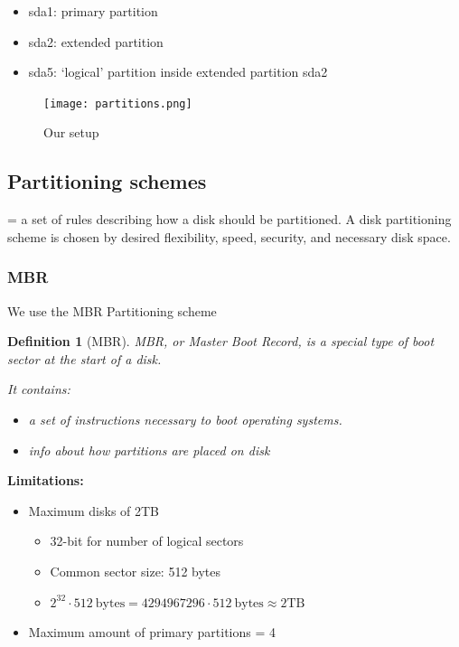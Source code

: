 \documentclass{article}
\newtheorem{theorem}{Definition}[section]
\begin{document}
\begin{itemize}
    \item sda1: primary partition
    \item sda2: extended partition
    \item sda5: `logical' partition inside extended partition sda2
\end{itemize}

\begin{figure}[H]
    \centering
    \texttt{[image: partitions.png]}
    \caption{Our setup}
\end{figure}

\subsection{Partitioning schemes}

= a set of rules describing how a disk should be partitioned.
A disk partitioning scheme is chosen by desired flexibility, speed, security, and necessary disk space.

\subsubsection{MBR}

We use the MBR Partitioning scheme

\begin{theorem}[MBR]
MBR, or Master Boot Record, is a special type of boot sector at the start of a disk.

It contains: 

\begin{itemize}
    \item a set of instructions necessary to boot operating systems.
    \item info about how partitions are placed on disk
\end{itemize}


\end{theorem}

\textbf{Limitations:}

\begin{itemize}
    \item Maximum disks of 2TB
    \begin{itemize}
        \item 32-bit for number of logical sectors
        \item Common sector size: 512 bytes
        \item $2^{32} \cdot 512\ \text{bytes} = 4 294 967 296 \cdot 512\ \text{bytes} \approx 2\text{TB}$
    \end{itemize}
    \item Maximum amount of primary partitions = 4
\end{itemize}
\end{document}
